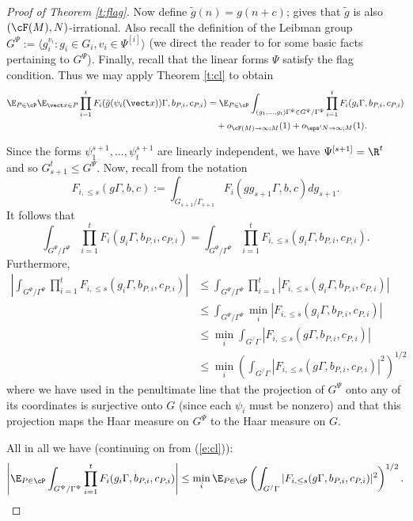\begin{proof}[Proof of Theorem \ref{t:flag}]
Now define $\tilde g(n) = g(n + c)$; \cite[Lemma A.8]{GT10} gives that $\tilde g$ is also $(\cF(M), N)$-irrational. Also recall the definition of the Leibman group $G^\Psi:= \langle g_i^{v_i}: g_i \in G_i, v_i \in \Psi^{[i]} \rangle$ (we direct the reader to \cite[Chapter 3]{GT10} for some basic facts pertaining to $G^\Psi$). Finally, recall that the linear forms $\Psi$ satisfy the flag condition. Thus we may apply Theorem \ref{t:cl} to obtain 
\begin{align}\label{e:cl}
\E_{P\in \cP}\E_{\vect x \in P} \prod_{i=1}^t  F_i(\tilde g(\psi_i(\vect x))\Gamma,b_{P,i},c_{P,i}) &= \E_{P\in \cP}\int_{(g_1,\ldots, g_t)\Gamma^\Psi \in G^{\Psi}/\Gamma^{\Psi}} \prod_{i=1}^t F_i(g_i\Gamma, b_{P,i}, c_{P,i})\\
&\quad + o_{\cF(M)\to \infty;M}(1) + o_{\eps'N \to \infty; M}(1).\nonumber
\end{align}



Since the forms $\psi_1^{s+1}, \ldots, \psi_t^{s+1}$ are linearly independent, we have $ \Psi^{[s+1]} = \R^t$ and so $G_{s+1}^t \leq G^{ \Psi}$. Now, recall from \cite[Chapter 7]{GT10} the notation \[F_{i,\leq s}(g\Gamma,b,c) := \int_{G_{s+1}/\Gamma_{s+1}} F_i(gg_{s+1}\Gamma,b,c)dg_{s+1}.\] It follows that 
\[\int_{G^{ \Psi}/\Gamma^{ \Psi}} \prod_{i=1}^t F_i(g_i\Gamma, b_{P,i}, c_{P,i}) = \int_{G^{ \Psi}/\Gamma^{ \Psi}} \prod_{i=1}^t F_{i,\leq s}(g_i\Gamma, b_{P,i}, c_{P,i}).\]
Furthermore, 
\begin{align*}
\left|\int_{G^{ \Psi}/\Gamma^{ \Psi}} \prod_{i=1}^t F_{i,\leq s}(g_i\Gamma, b_{P,i}, c_{P,i})\right| &\leq \int_{G^{ \Psi}/\Gamma^{ \Psi}} \prod_{i=1}^t \left|F_{i,\leq s}(g_i\Gamma, b_{P,i}, c_{P,i})\right| \\
&\leq \int_{G^{ \Psi}/\Gamma^{ \Psi}} \min_i|F_{i,\leq s}(g_i\Gamma, b_{P,i}, c_{P,i})| \\ &\leq \min_i \int_{G^/\Gamma} |F_{i,\leq s}(g\Gamma, b_{P,i}, c_{P,i})| \\
&\leq \min_i \left(\int_{G^/\Gamma} |F_{i,\leq s}(g\Gamma, b_{P,i}, c_{P,i})|^2\right)^{1/2}
\end{align*}
where we have used in the penultimate line that the projection of $G^{ \Psi}$ onto any of its coordinates is surjective onto $G$ (since each $\psi_i$ must be nonzero) and that this projection maps the Haar measure on $G^\Psi$ to the Haar measure on $G$. 

All in all we have (continuing on from (\ref{e:cl})):
\begin{equation}\label{e:projbd}
\left|\E_{P\in \cP}\int_{G^{ \Psi}/\Gamma^{ \Psi}} \prod_{i=1}^t F_i(g_i\Gamma, b_{P,i}, c_{P,i})\right| \leq \min_i \E_{P\in \cP} \left(\int_{G^/\Gamma} |F_{i,\leq s}(g\Gamma, b_{P,i}, c_{P,i})|^2\right)^{1/2}.
\end{equation}


\end{proof}
